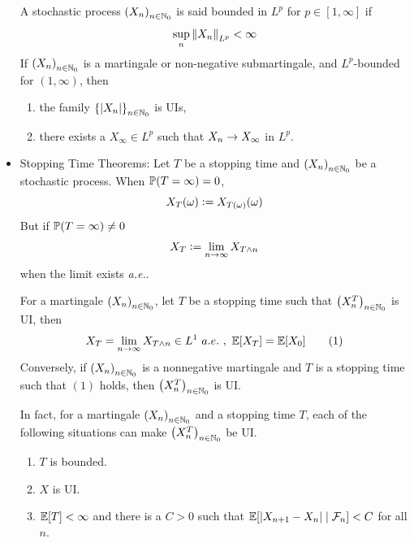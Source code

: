 \documentclass[a4paper,12pt]{article}
\begin{document}
\begin{itemize}
  \noindent A stochastic process $\left(X_n\right)_{n\in \mathbb{N}_0}$ is said bounded in $L^p$ for $p\in [1,\infty]$ if
  \begin{equation*}
    \sup_n \left\lVert X_n\right\lVert_{L^p} < \infty
  \end{equation*}
  If $\left(X_n\right)_{n\in \mathbb{N}_0}$ is a martingale or non-negative submartingale, and $L^p$-bounded for $(1,\infty)$, then
  \begin{enumerate}[label=(\arabic*)]
    \item the family $\left\{\left\lvert X_n\right\lvert\right\}_{n\in \mathbb{N}_0}$ is UIs,
    \item there exists a $X_{\infty} \in L^p$ such that $X_n \rightarrow X_{\infty}$ in $L^p$.
  \end{enumerate}

  \item Stopping Time Theorems: Let $T$ be a stopping time and $\left(X_n\right)_{n\in \mathbb{N}_0}$ be a stochastic process. When $\mathbb{P}(T = \infty) = 0$, 
  \begin{equation*}
    X_T(\omega) \vcentcolon= X_{T(\omega)}(\omega)
  \end{equation*}
  But if $\mathbb{P}(T = \infty) \neq 0$
  \begin{equation*}
    X_T \vcentcolon= \lim_{n\rightarrow \infty}X_{T \wedge n}
  \end{equation*}
  when the limit exists \emph{a.e.}.

  \begin{prop}[UI conditions]
    For a martingale $\left(X_n\right)_{n\in \mathbb{N}_0}$, let $T$ be a stopping time such that $\left(X^T_n\right)_{n\in \mathbb{N}_0}$ is UI, then 
    \begin{equation*}
      X_T = \lim_{n\rightarrow \infty}X_{T \wedge n} \in L^1~a.e.~,~\mathbb{E}[X_T] = \mathbb{E}[X_0] \tag{$1$}
    \end{equation*}
    Conversely, if $\left(X_n\right)_{n\in \mathbb{N}_0}$ is a nonnegative martingale and $T$ is a stopping time such that $(1)$ holds, then $\left(X^T_n\right)_{n\in \mathbb{N}_0}$ is UI.
  \end{prop}

  \noindent In fact, for a martingale $\left(X_n\right)_{n\in \mathbb{N}_0}$ and a stopping time $T$, each of the following situations can make $\left(X^T_n\right)_{n\in \mathbb{N}_0}$ be UI.
  \begin{enumerate}[label=\Roman*.]
    \item $T$ is bounded.
    \item $X$ is UI.
    \item $\mathbb{E}[T] < \infty$ and there is a $C> 0$ such that $\mathbb{E}[\left\lvert X_{n+1}-X_n\right\lvert \mid \mathcal{F}_n] < C$ for all $n$.
  \end{enumerate}


\end{itemize}
\end{document}
